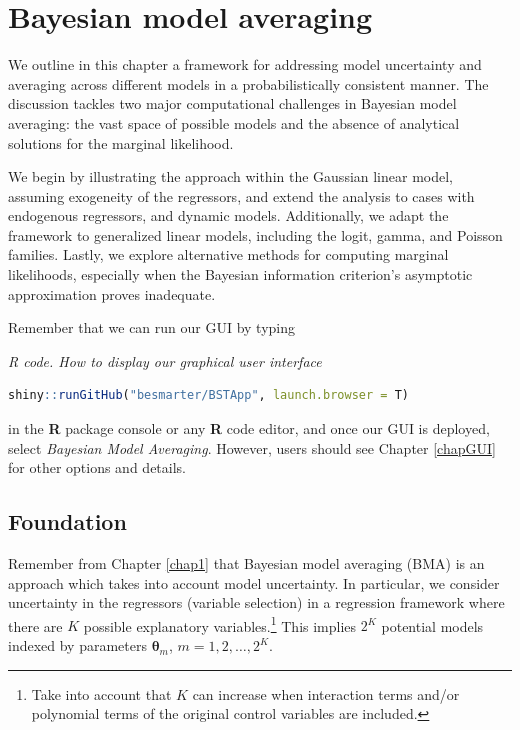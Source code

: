\chapter{Bayesian model averaging}\label{chap10}

We outline in this chapter a framework for addressing model uncertainty and averaging across different models in a probabilistically consistent manner. The discussion tackles two major computational challenges in Bayesian model averaging: the vast space of possible models and the absence of analytical solutions for the marginal likelihood.

We begin by illustrating the approach within the Gaussian linear model, assuming exogeneity of the regressors, and extend the analysis to cases with endogenous regressors, and dynamic models. Additionally, we adapt the framework to generalized linear models, including the logit, gamma, and Poisson families. Lastly, we explore alternative methods for computing marginal likelihoods, especially when the Bayesian information criterion's asymptotic approximation proves inadequate.  

Remember that we can run our GUI by typing

\begin{tcolorbox}[enhanced,width=4.67in,center upper,
	fontupper=\large\bfseries,drop shadow southwest,sharp corners]
	\textit{R code. How to display our graphical user interface}
	\begin{VF}
		\begin{lstlisting}[language=R]
	shiny::runGitHub("besmarter/BSTApp", launch.browser = T)\end{lstlisting}
	\end{VF}
\end{tcolorbox} 

in the \textbf{R} package console or any \textbf{R} code editor, and once our GUI is deployed, select \textit{Bayesian Model Averaging}. However, users should see Chapter \ref{chapGUI} for other options and details.

\section{Foundation}\label{sec10_1}
Remember from Chapter \ref{chap1} that Bayesian model averaging (BMA) is an approach which takes into account model uncertainty. In particular, we consider uncertainty in the regressors (variable selection) in a regression framework where there are $K$ possible explanatory variables.\footnote{Take into account that $K$ can increase when interaction terms and/or polynomial terms of the original control variables are included.} This implies $2^K$ potential models indexed by parameters $\bm{\theta}_m$, $m=1,2,\dots,2^K$.

